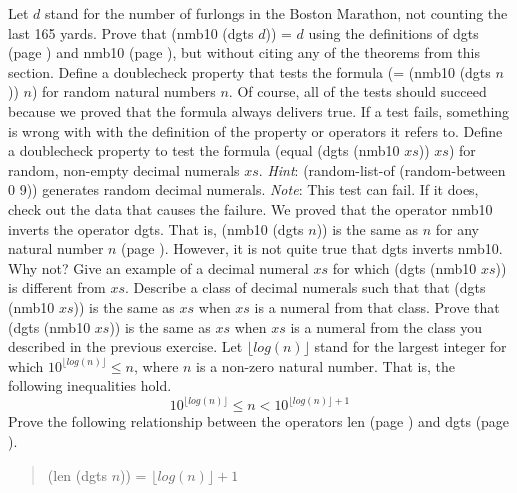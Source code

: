 \begin{ExerciseList}
\Exercise Let $d$ stand for the number of furlongs in
     the Boston Marathon, not counting the last 165 yards.
     Prove that (nmb10 (dgts $d$)) = $d$
     using the definitions of dgts (page \pageref{dgts-defun})
     and nmb10 (page \pageref{nmb10-defun}),
     but without citing any of the theorems from this section.
\Exercise Define a doublecheck property that tests
     the formula (= (nmb10 (dgts $n$)) $n$) for random
     natural numbers $n$.
     Of course, all of the tests should succeed because
     we proved that the formula always delivers true.
     If a test fails, something is wrong with
     with the definition of the property or operators it refers to.
\Exercise Define a doublecheck property to test the formula
     (equal (dgts (nmb10 $xs$)) $xs$) for random, non-empty
     decimal numerals $xs$.
     \emph{Hint}: (random-list-of (random-between 0 9))
     generates random decimal numerals.
     \emph{Note}: This test can fail.
     If it does, check out the data that causes the failure.
\Exercise We proved that the operator nmb10
     inverts the operator dgts.
     That is, (nmb10 (dgts $n$)) is the same as $n$
     for any natural number $n$ (page \pageref{dgts-ok}).
     However, it is not quite true that dgts inverts nmb10.
     Why not? Give an example of a decimal numeral
     $xs$ for which (dgts (nmb10 $xs$)) is different from $xs$.
\Exercise Describe a class of decimal numerals such that
     that (dgts (nmb10 $xs$)) is the same as $xs$
     when $xs$ is a numeral from that class.
\Exercise Prove that
    (dgts (nmb10 $xs$)) is the same as $xs$
     when $xs$ is a numeral from the class
     you described in the previous exercise.
\Exercise Let $\lfloor log(n) \rfloor$ stand for the
    largest integer for which $10^{\lfloor log(n) \rfloor} \leq n$,
    where $n$ is a non-zero natural number.
    That is, the following inequalities hold.
\begin{displaymath}
  10^{\lfloor log(n) \rfloor} \le n < 10^{\lfloor log(n) \rfloor + 1}
\end{displaymath}
    Prove the following relationship between the operators
    len (page \pageref{len-equations}) and dgts (page \pageref{dgts-defun}).
\begin{quote}
    (len (dgts $n$)) = $\lfloor log(n) \rfloor + 1$
\end{quote}

\end{ExerciseList}


